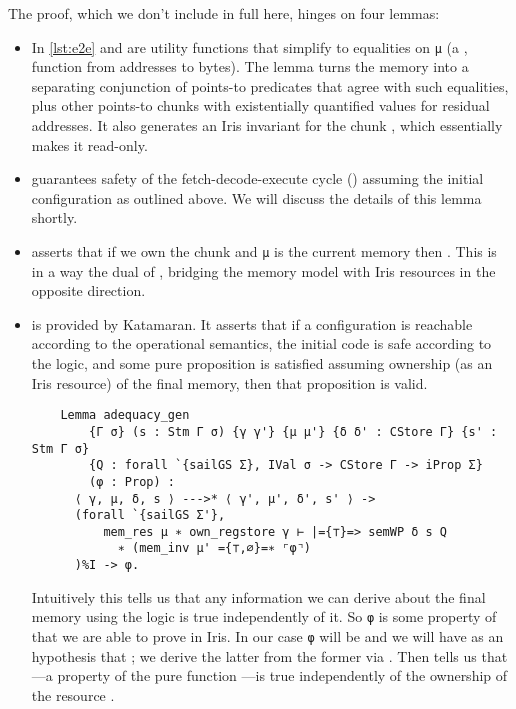 The proof, which we don't include in full here, hinges on four lemmas:
\begin{itemize}
\item In \cref{lst:e2e}  and  are utility functions that simplify to equalities on \texttt{\small μ} (a , \ie function from addresses to bytes). The  lemma turns the memory into a separating conjunction of points-to predicates that agree with such equalities, plus other points-to chunks with existentially quantified values for residual addresses. It also generates an Iris invariant for the chunk , which essentially makes it read-only.
\item {} guarantees safety of the fetch-decode-execute cycle (\ie {}) assuming the initial configuration as outlined above. We will discuss the details of this lemma shortly.
\item {} asserts that if we own the chunk  and \texttt{\small μ} is the current memory then . This is in a way the dual of , bridging the memory model with Iris resources in the opposite direction.
\item {} is provided by Katamaran. It  asserts that if a configuration is reachable according to the operational semantics, the initial code is safe according to the logic, and some pure proposition is satisfied assuming ownership (as an Iris resource) of the final memory, then that proposition is valid.

  \begin{verbatim}
    Lemma adequacy_gen
        {Γ σ} (s : Stm Γ σ) {γ γ'} {μ μ'} {δ δ' : CStore Γ} {s' : Stm Γ σ}
        {Q : forall `{sailGS Σ}, IVal σ -> CStore Γ -> iProp Σ}
        (φ : Prop) :
      ⟨ γ, μ, δ, s ⟩ --->* ⟨ γ', μ', δ', s' ⟩ ->
      (forall `{sailGS Σ'},
          mem_res μ ∗ own_regstore γ ⊢ |={⊤}=> semWP δ s Q
            ∗ (mem_inv μ' ={⊤,∅}=∗ ⌜φ⌝)
      )%I -> φ.
  \end{verbatim}

  Intuitively this tells us that any information we can derive about the final memory using the logic is true independently of it. So \texttt{\small φ} is some property of  that we are able to prove in Iris. In our case \texttt{\small φ} will be  and we will have as an hypothesis that ; we derive the latter from the former via . Then  tells us that ---a property of the pure function ---is true independently of the ownership of the resource .
\end{itemize}
